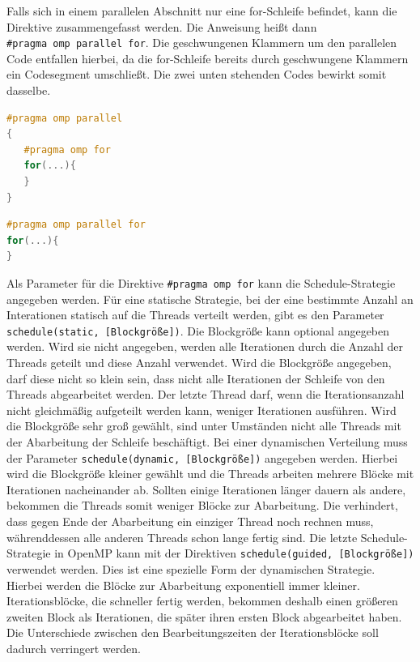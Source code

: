 \documentclass[../main.tex]{subfiles}
\begin{document}
Falls sich in einem parallelen Abschnitt nur eine for-Schleife befindet, kann die Direktive zusammengefasst werden. Die Anweisung heißt dann \texttt{\#pragma\ omp\ parallel\ for}. Die geschwungenen Klammern um den parallelen Code entfallen hierbei, da die for-Schleife bereits durch geschwungene Klammern ein Codesegment umschließt. Die zwei unten stehenden Codes bewirkt somit dasselbe.

\begin{lstlisting}[language=c++, caption=For innerhalb eines parallelen Abschnitts, captionpos=b, label=listing:for_in_parallel, frame=single, linewidth=\textwidth, breaklines=true]
#pragma omp parallel
{
   #pragma omp for
   for(...){
   }
}
\end{lstlisting}


\begin{lstlisting}[language=c++, caption=Kurzschreibweise einer parallelen For-Schleife, captionpos=b, label=listing:parallel_for, frame=single, linewidth=\textwidth, breaklines=true]
#pragma omp parallel for
for(...){
}
\end{lstlisting}

Als Parameter für die Direktive \texttt{\#pragma omp for} kann die Schedule-Strategie angegeben werden. Für eine statische Strategie, bei der eine bestimmte Anzahl an Interationen statisch auf die Threads verteilt werden, gibt es den Parameter \texttt{schedule(static, [Blockgröße])}. Die Blockgröße kann optional angegeben werden. Wird sie nicht angegeben, werden alle Iterationen durch die Anzahl der Threads geteilt und diese Anzahl verwendet. Wird die Blockgröße angegeben, darf diese nicht so klein sein, dass nicht alle Iterationen der Schleife von den Threads abgearbeitet werden. Der letzte Thread darf, wenn die Iterationsanzahl nicht gleichmäßig aufgeteilt werden kann, weniger Iterationen ausführen. Wird die Blockgröße sehr groß gewählt, sind unter Umständen nicht alle Threads mit der Abarbeitung der Schleife beschäftigt.
Bei einer dynamischen Verteilung muss der Parameter \texttt{schedule(dynamic, [Blockgröße])} angegeben werden. Hierbei wird die Blockgröße kleiner gewählt und die Threads arbeiten mehrere Blöcke mit Iterationen nacheinander ab. Sollten einige Iterationen länger dauern als andere, bekommen die Threads somit weniger Blöcke zur Abarbeitung. Die verhindert, dass gegen Ende der Abarbeitung ein einziger Thread noch rechnen muss, währenddessen alle anderen Threads schon lange fertig sind.
Die letzte Schedule-Strategie in OpenMP kann mit der Direktiven \texttt{schedule(guided, [Blockgröße])} verwendet werden. Dies ist eine spezielle Form der dynamischen Strategie. Hierbei werden die Blöcke zur Abarbeitung exponentiell immer kleiner. Iterationsblöcke, die schneller fertig werden, bekommen deshalb einen größeren zweiten Block als Iterationen, die später ihren ersten Block abgearbeitet haben. Die Unterschiede zwischen den Bearbeitungszeiten der Iterationsblöcke soll dadurch verringert werden.
\end{document}
